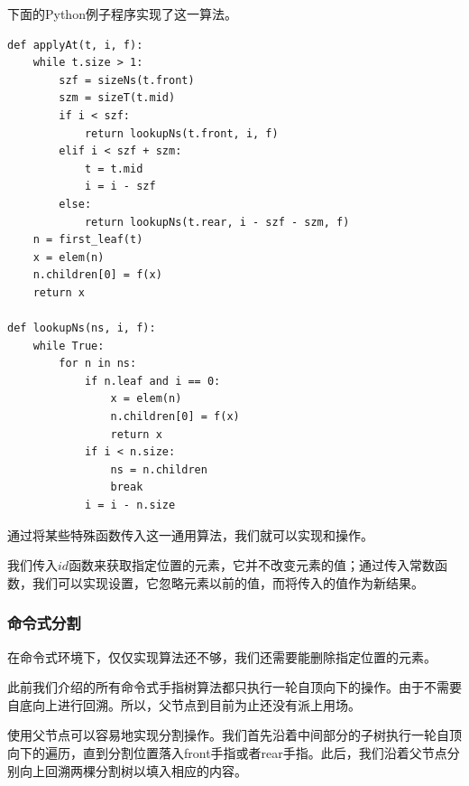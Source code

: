 \documentclass[b5paper]{ctexart}
\begin{document}
下面的Python例子程序实现了这一算法。

\lstset{language=Python}
\begin{lstlisting}
def applyAt(t, i, f):
    while t.size > 1:
        szf = sizeNs(t.front)
        szm = sizeT(t.mid)
        if i < szf:
            return lookupNs(t.front, i, f)
        elif i < szf + szm:
            t = t.mid
            i = i - szf
        else:
            return lookupNs(t.rear, i - szf - szm, f)
    n = first_leaf(t)
    x = elem(n)
    n.children[0] = f(x)
    return x

def lookupNs(ns, i, f):
    while True:
        for n in ns:
            if n.leaf and i == 0:
                x = elem(n)
                n.children[0] = f(x)
                return x
            if i < n.size:
                ns = n.children
                break
            i = i - n.size
\end{lstlisting}

通过将某些特殊函数传入这一通用算法，我们就可以实现和操作。

\begin{algorithmic}
  \State \Return {}
\EndFunction
\Statex
{}
  \State \Return {}
\EndFunction
\end{algorithmic}

我们传入$id$函数来获取指定位置的元素，它并不改变元素的值；通过传入常数函数，我们可以实现设置，它忽略元素以前的值，而将传入的值作为新结果。

\subsubsection{命令式分割}

在命令式环境下，仅仅实现算法还不够，我们还需要能删除指定位置的元素。

此前我们介绍的所有命令式手指树算法都只执行一轮自顶向下的操作。由于不需要自底向上进行回溯。所以，父节点到目前为止还没有派上用场。

使用父节点可以容易地实现分割操作。我们首先沿着中间部分的子树执行一轮自顶向下的遍历，直到分割位置落入front手指或者rear手指。此后，我们沿着父节点分别向上回溯两棵分割树以填入相应的内容。
\end{document}
